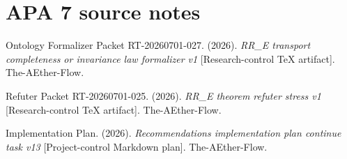 \documentclass[11pt]{article}
\begin{document}
\section{APA 7 source notes}

Ontology Formalizer Packet RT-20260701-027. (2026). \emph{RR\_E transport
completeness or invariance law formalizer v1} [Research-control TeX artifact].
The-AEther-Flow.

Refuter Packet RT-20260701-025. (2026). \emph{RR\_E theorem refuter stress
v1} [Research-control TeX artifact]. The-AEther-Flow.

Implementation Plan. (2026). \emph{Recommendations implementation plan
continue task v13} [Project-control Markdown plan]. The-AEther-Flow.
\end{document}
